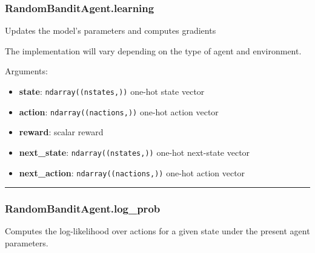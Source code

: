 \subsubsection{RandomBanditAgent.learning}\label{randombanditagent.learning}

\begin{Shaded}
\begin{Highlighting}[]
\end{Highlighting}
\end{Shaded}

Updates the model's parameters and computes gradients

The implementation will vary depending on the type of agent and
environment.

Arguments:

\begin{itemize}
\tightlist
\item
  \textbf{state}: \texttt{ndarray((nstates,))} one-hot state vector
\item
  \textbf{action}: \texttt{ndarray((nactions,))} one-hot action vector
\item
  \textbf{reward}: scalar reward
\item
  \textbf{next\_state}: \texttt{ndarray((nstates,))} one-hot next-state
  vector
\item
  \textbf{next\_action}: \texttt{ndarray((nactions,))} one-hot action
  vector
\end{itemize}

\begin{center}\rule{0.5\linewidth}{\linethickness}\end{center}

\subsubsection{RandomBanditAgent.log\_prob}\label{randombanditagent.log_prob}

\begin{Shaded}
\begin{Highlighting}[]
\end{Highlighting}
\end{Shaded}

Computes the log-likelihood over actions for a given state under the
present agent parameters.

